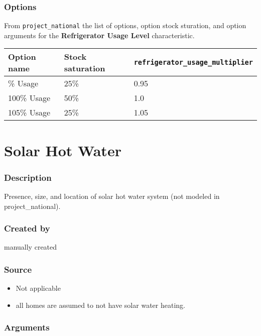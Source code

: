 \subsubsection{Options}\label{options-139}

From \texttt{project\_national} the list of options, option stock
sturation, and option arguments for the \textbf{Refrigerator Usage
Level} characteristic.

\begin{longtable}[]{@{}lll@{}}
\toprule\noalign{}
Option name & Stock saturation &
\texttt{refrigerator\_usage\_multiplier} \\
\midrule\noalign{}
\endhead
\bottomrule\noalign{}
\endlastfoot
95\% Usage & 25\% & 0.95 \\
100\% Usage & 50\% & 1.0 \\
105\% Usage & 25\% & 1.05 \\
\end{longtable}


\section{Solar Hot Water}\label{solar_hot_water}

\subsubsection{Description}\label{description-137}

Presence, size, and location of solar hot water system (not modeled in
project\_national).

\subsubsection{Created by}\label{created-by-138}

manually created

\subsubsection{Source}\label{source-140}

\begin{itemize}
 
\item
  Not applicable
\item
  all homes are assumed to not have solar water heating.
\end{itemize}

\subsubsection{Arguments}\label{arguments-99}

